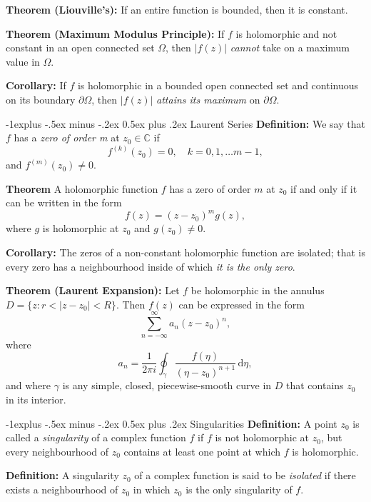 \documentclass[10pt,landscape]{article}
\makeatletter
\renewcommand{\subsection}{\@startsection{subsection}{2}{0mm}%
                                {-1explus -.5ex minus -.2ex}%
                                {0.5ex plus .2ex}%
                                {\normalfont\normalsize\bfseries}}
\makeatother
\begin{document}
\begin{multicols}{3}
\textbf{Theorem (Liouville's):} If an entire function is bounded, then it
is constant.

\textbf{Theorem (Maximum Modulus Principle):}  If $f$ is holomorphic and not
constant in an open connected set $\Omega$, then $|f(z)|$ \textit{cannot} take on a maximum value in $\Omega$.

\textbf{Corollary:} If $f$ is holomorphic in a bounded open connected set and
continuous on its boundary $\partial \Omega$, then $|f(z)|$ \textit{attains its maximum} on $\partial \Omega$.


\subsection{Laurent Series}
\textbf{Definition:} We say that $f$ has a \textit{zero of order m} at $z_0 \in \mathbb{C}$ if $$f^{(k)}(z_0) = 0, \quad k = 0,1,\ldots m-1,$$ and $f^{(m)}(z_0) \neq 0.$

\textbf{Theorem} A holomorphic function $f$ has a zero of order $m$ at $z_0$ if and
only if it can be written in the form
$$f(z) = (z-z_0)^mg(z),$$
where $g$ is holomorphic at $z_0$ and $g(z_0) \neq 0$.

\textbf{Corollary:} The zeros of a non-constant holomorphic function are isolated;
that is every zero has a neighbourhood inside of which \textit{it is the only
zero}. 

\textbf{Theorem (Laurent Expansion):} Let $f$ be holomorphic in the
annulus $D = \{z : r < |z - z_0| < R\}.$ Then $f(z)$ can be expressed in the
form $$\sum_{n = -\infty}^{\infty} a_n (z - z_0)^n,$$ where $$a_n = \frac{1}{2 \pi i} \oint_{\gamma} \frac{f(\eta)}{(\eta - z_0)^{n+1}} \, \text{d}\eta,$$ and where $\gamma$ is any simple, closed, piecewise-smooth curve in $D$ that contains
$z_0$ in its interior.

\subsection{Singularities}
\textbf{Definition:} A point $z_0$ is called a \textit{singularity} of a complex function $f$ if $f$
is not holomorphic at $z_0$, but every neighbourhood of $z_0$ contains at least
one point at which $f$ is holomorphic.

\textbf{Definition:} A singularity $z_0$ of a complex function is said to be \textit{isolated} if
there exists a neighbourhood of $z_0$ in which $z_0$ is the only singularity of $f$.


\end{multicols}
\end{document}
